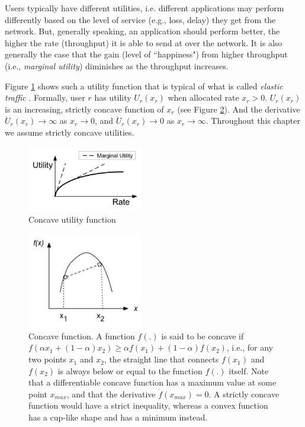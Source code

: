 \documentclass{article}
\begin{document}
Users typically have different utilities, i.e. different applications may perform differently based on the level of service (e.g., loss, delay) they get from the network. But, generally speaking, an application should perform better, the higher the rate (throughput) it is able to send at over the network. It is also generally the case that the gain (level of ``happiness") from higher throughput (i.e., {\em marginal utility}) diminishes as the throughput increases.  

Figure \ref{fig:concave-utility} shows such a utility function that is typical of what is called 
{\em elastic traffic} \cite{elastic:2006}. 
Formally, user $r$ has utility $U_r(x_r)$ when allocated rate $x_r > 0$. 
$U_r(x_r)$ is an increasing, strictly concave function of $x_r$ (see Figure \ref{fig:concave-function}).
And the derivative $\dot{U}_r(x_r) \rightarrow \infty$ as $x_r \rightarrow 0$,
and  $\dot{U}_r(x_r) \rightarrow 0$ as $x_r \rightarrow \infty$.
Throughout this chapter we assume strictly concave utilities.

\begin{figure}[htbp] %
   \centering
   \includegraphics[width=2in]{figures/concave-utility.jpg} 
   \caption{Concave utility function}
   \label{fig:concave-utility}
\end{figure}

\begin{figure}[htbp] %
   \centering
   \includegraphics[width=2in]{figures/concave-function.jpg} 
   \caption{Concave function. 
   A function $f(.)$ is said to be concave if $f(\alpha x_1 + (1-\alpha)x_2) \geq \alpha f(x_1) + (1-\alpha) f(x_2)$,
   i.e., for any two points $x_1$ and $x_2$, the straight line  that connects $f(x_1)$ and $f(x_2)$ is always below
   or equal to the function $f(.)$ itself. 
   Note that a differentiable concave function has a maximum value at some point $x_{max}$, and 
   that the derivative $\dot{f}(x_{max}) = 0.$
   A strictly concave function would have a strict inequality, whereas a convex function has a cup-like shape and
    has a minimum instead.}
   \label{fig:concave-function}
\end{figure}
\end{document}
